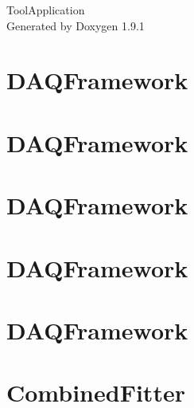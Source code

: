 \let\mypdfximage\pdfximage\def\pdfximage{\immediate\mypdfximage}\documentclass[twoside]{book}
\newcommand{\+}{\discretionary{\mbox{\scriptsize$\hookleftarrow$}}{}{}}
\newcommand{\clearemptydoublepage}{%
  \newpage{\pagestyle{empty}\cleardoublepage}%
}
\begin{document}
\raggedbottom

\hypersetup{pageanchor=false,
             bookmarksnumbered=true,
             pdfencoding=unicode
            }
\begin{titlepage}
\vspace*{7cm}
\begin{center}%
{\Large Tool\+Application }\\
\vspace*{1cm}
{\large Generated by Doxygen 1.9.1}\\
\end{center}
\end{titlepage}
\clearemptydoublepage
{}
\tableofcontents
\clearemptydoublepage
{}
\hypersetup{pageanchor=true}

\chapter{DAQFramework}
\label{md_UserTools_AddTree_README}

\chapter{DAQFramework}
\label{md_UserTools_BuildHist_README}

\chapter{DAQFramework}
\label{md_UserTools_CalculateNeutronCloudVertex_README}

\chapter{DAQFramework}
\label{md_UserTools_CalculatePreactivityObservables_README}

\chapter{DAQFramework}
\label{md_UserTools_CalculateSpallationVariables_README}

\chapter{Combined\+Fitter}
\label{md_UserTools_CombinedFitter_README}

\end{document}
